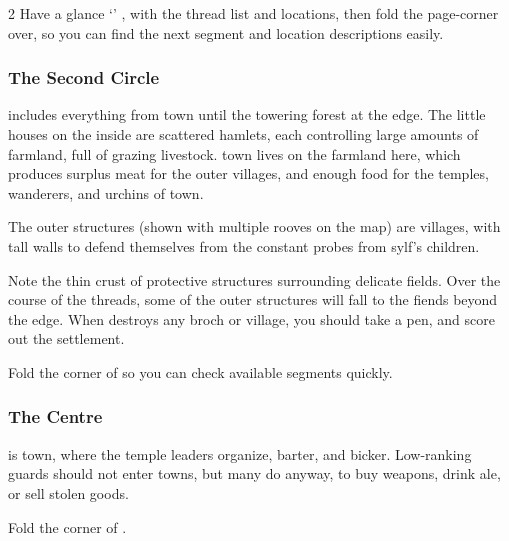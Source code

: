 \begin{multicols}{2}
Have a glance `' , with the \gls{thread} list and locations, then fold the page-corner over, so you can find the next \gls{segment} and location descriptions easily.

\subsubsection{The Second Circle}
includes everything from \gls{town} until the towering forest at the \gls{edge}.
The little houses on the inside are scattered hamlets, each controlling large amounts of farmland, full of grazing livestock.
\Gls{town} lives on the farmland here, which produces surplus meat for the outer \glspl{village}, and enough food for the \glspl{temple}, wanderers, and urchins of \gls{town}.

The outer structures (shown with multiple rooves on the map) are \glspl{village}, with tall walls to defend themselves from the constant probes from \gls{sylf}'s children.

Note the thin crust of protective structures surrounding delicate fields.
Over the course of the \glspl{thread}, some of the outer structures will fall to the \glspl{fiend} beyond the \gls{edge}.
When  destroys any \gls{broch} or \gls{village}, you should take a pen, and score out the settlement.

Fold the corner of  so you can check available \glspl{segment} quickly.



\subsubsection{The Centre}
is \gls{town}, where the \gls{temple} leaders organize, barter, and bicker.
Low-ranking \glspl{guard} should not enter towns, but many do anyway, to buy weapons, drink ale, or sell stolen goods.

Fold the corner of .



\renewcommand\csComments{
  \mapCircle{16}{76}{1.7}{Dyson_Logos/bandit_camp}
  \mapCircle{35}{88}{2}{Dyson_Logos/forgotten_city}
  \mapCircle{27}{09}{2}{Dyson_Logos/qualme_temple}
  \mapCircle[4]{56}{52}{2.5}{Dyson_Logos/town}
  \mapCircle{44}{41}{2}{Dyson_Logos/redfall}
  \mapCircle{83}{09}{1.7}{Dyson_Logos/shadow_gate}
  \mapCircle{86}{45}{1.7}{Dyson_Logos/lochside}
  \draw[very thick,white] (11,0.6) -- (12,0.6) node[anchor=north]{\outline{10 Miles}} -- (13,0.6) ;
}


\end{multicols}

